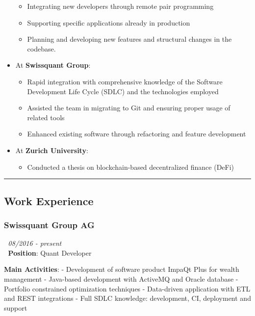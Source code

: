 \begin{itemize}
  \begin{itemize}
  \tightlist
  \item
    Integrating new developers through remote pair programming
  \item
    Supporting specific applications already in production
  \item
    Planning and developing new features and structural changes in the
    codebase.
  \end{itemize}
\item
  At \textbf{Swissquant Group}:

  \begin{itemize}
  \tightlist
  \item
    Rapid integration with comprehensive knowledge of the Software
    Development Life Cycle (SDLC) and the technologies employed
  \item
    Assisted the team in migrating to Git and ensuring proper usage of
    related tools
  \item
    Enhanced existing software through refactoring and feature
    development
  \end{itemize}
\item
  At \textbf{Zurich University}:

  \begin{itemize}
  \tightlist
  \item
    Conducted a thesis on blockchain-based decentralized finance (DeFi)
  \end{itemize}
\end{itemize}

\begin{center}\rule{0.5\linewidth}{0.5pt}\end{center}

\subsection{Work Experience}\label{work-experience}

\subsubsection{\texorpdfstring{\textbf{Swissquant Group
AG}}{Swissquant Group AG}}\label{swissquant-group-ag}

📅 \emph{08/2016 - present}\\
🔹 \textbf{Position}: Quant Developer

\textbf{Main Activities}: - Development of software product ImpaQt Plus
for wealth management - Java-based development with ActiveMQ and Oracle
database - Portfolio constrained optimization techniques - Data-driven
application with ETL and REST integrations - Full SDLC knowledge:
development, CI, deployment and support


